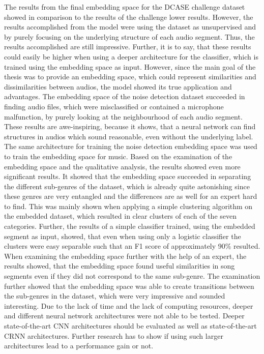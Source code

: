 The results from the final embedding space for the \gls{DCASE} challenge dataset showed in comparison to the results of the challenge lower results. However, the results accomplished from the model were using the dataset as unsupervised and by purely focusing on the underlying structure of each audio segment. Thus, the results accomplished are still impressive. Further, it is to say, that these results could easily be higher when using a deeper architecture for the classifier, which is trained using the embedding space as input. However, since the main goal of the thesis was to provide an embedding space, which could represent similarities and dissimilarities between audios, the model showed its true application and advantages. The embedding space of the noise detection dataset succeeded in finding audio files, which were misclassified or contained a microphone malfunction, by purely looking at the neighbourhood of each audio segment. These results are awe-inspiring, because it shows, that a neural network can find structures in audios which sound reasonable, even without the underlying label.
\newline
\newline
The same architecture for training the noise detection embedding space was used to train the embedding space for music. Based on the examination of the embedding space and the qualitative analysis, the results showed even more significant results. It showed that the embedding space succeeded in separating the different sub-genres of the dataset, which is already quite astonishing since these genres are very entangled and the differences are as well for an expert hard to find. This was mainly shown when applying a simple clustering algorithm on the embedded dataset, which resulted in clear clusters of each of the seven categories. Further, the results of a simple classifier trained, using the embedded segment as input, showed, that even when using only a logistic classifier the clusters were easy separable such that an F1 score of approximately 90\% resulted. When examining the embedding space further with the help of an expert, the results showed, that the embedding space found useful similarities in song segments even if they did not correspond to the same sub-genre. The examination further showed that the embedding space was able to create transitions between the sub-genres in the dataset, which were very impressive and sounded interesting.
\newline
\newline
Due to the lack of time and the lack of computing resources, deeper and different neural network architectures were not able to be tested. Deeper state-of-the-art \gls{CNN} architectures should be evaluated as well as state-of-the-art \gls{CRNN} architectures. Further research has to show if using such larger architectures lead to a performance gain or not.
